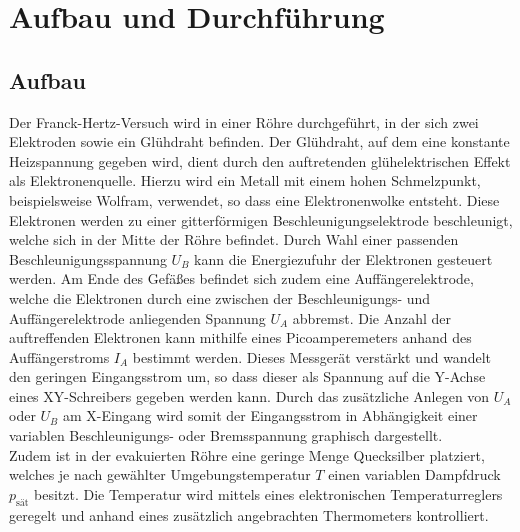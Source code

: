 \section{Aufbau und Durchführung}
\subsection{Aufbau}
\label{sec:Aufbau}

Der Franck-Hertz-Versuch wird in einer Röhre durchgeführt, in der sich zwei Elektroden sowie ein Glühdraht befinden.
Der Glühdraht, auf dem eine konstante Heizspannung gegeben wird, dient durch den auftretenden glühelektrischen Effekt als Elektronenquelle.
Hierzu wird ein Metall mit einem hohen Schmelzpunkt, beispielsweise Wolfram, verwendet, so dass eine Elektronenwolke entsteht.
Diese Elektronen werden zu einer gitterförmigen Beschleunigungselektrode beschleunigt, welche sich in der Mitte der Röhre befindet.
Durch Wahl einer passenden Beschleunigungsspannung $U_B$ kann die Energiezufuhr der Elektronen gesteuert werden.
Am Ende des Gefäßes befindet sich zudem eine Auffängerelektrode, welche die Elektronen durch eine zwischen der Beschleunigungs- und Auffängerelektrode anliegenden Spannung $U_A$ abbremst.
Die Anzahl der auftreffenden Elektronen kann mithilfe eines Picoamperemeters anhand des Auffängerstroms $I_A$ bestimmt werden.
Dieses Messgerät verstärkt und wandelt den geringen Eingangsstrom um, so dass dieser als Spannung auf die Y-Achse eines XY-Schreibers gegeben werden kann.
Durch das zusätzliche Anlegen von $U_A$ oder $U_B$ am X-Eingang wird somit der Eingangsstrom in Abhängigkeit einer variablen Beschleunigungs- oder Bremsspannung graphisch dargestellt.
\\

Zudem ist in der evakuierten Röhre eine geringe Menge Quecksilber platziert, welches je nach gewählter Umgebungstemperatur $T$ einen variablen Dampfdruck $p_\text{sät}$ besitzt.
Die Temperatur wird mittels eines elektronischen Temperaturreglers geregelt und anhand eines zusätzlich angebrachten Thermometers kontrolliert.
